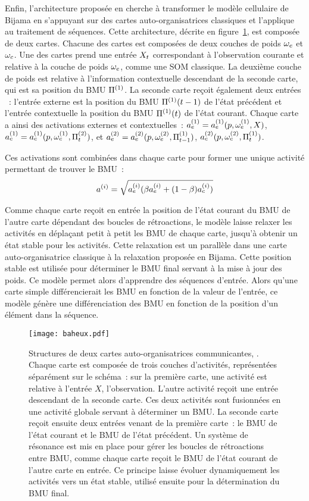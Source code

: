 \documentclass[../main]{subfiles}
\begin{document}
Enfin, l'architecture proposée en \cite{baheux_towards_2014} cherche à transformer le modèle cellulaire de Bijama en s'appuyant sur des cartes auto-organisatrices classiques et l'applique au traitement de séquences. Cette architecture, décrite en figure~\ref{fig:baheux}, est composée de deux cartes. 
Chacune des cartes est composées de deux couches de poids $\omega_e$ et $\omega_c$. Une des cartes prend une entrée $X_t$ correspondant à l'observation courante et relative à la couche de poids $\omega_e$, comme une SOM classique. 
La deuxième couche de poids est relative à l'information contextuelle descendant de la seconde carte, qui est sa position du BMU $\Pi^{({1})}$.
La seconde carte reçoit également deux entrées ~: l'entrée externe est la position du BMU $\Pi^{({1})}(t-1)$ de l'état précédent et l'entrée contextuelle la position du BMU $\Pi^{({1})}(t)$ de l'état courant. 
Chaque carte a ainsi des activations externes et contextuelles~: $a_e^{({1})} = a_e^{({1})}(p, \omega_e^{({1})},X)$, $a_c^{({1})} =  a_c^{({1})}(p, \omega_c^{({1})},\Pi^{({2})}_t)$, et $a_e^{({2})} = a_e^{({2})}(p, \omega_e^{({2})},\Pi^{({1})}_{t-1})$, $a_c^{({2})}(p, \omega_c^{({2})}, \Pi^{({1})}_t)$.

Ces activations sont combinées dans chaque carte pour former une unique activité permettant de trouver le BMU~:
$$
a^{({i})} = \sqrt{a_e^{({i})}(\beta a_e^{({i})} + (1-\beta) a_c^{({i})})}
$$

Comme chaque carte reçoit en entrée la position de l'état courant du BMU de l'autre carte dépendant des boucles de rétroactions, le modèle laisse relaxer les activités en déplaçant petit à petit les BMU de chaque carte, jusqu'à obtenir un état stable pour les activités. Cette relaxation est un parallèle dans une carte auto-organisatrice classique à la relaxation proposée en Bijama.
Cette position stable est utilisée pour déterminer le BMU final servant à la mise à jour des poids.
Ce modèle permet alors d'apprendre des séquences d'entrée. Alors qu'une carte simple différencierait les BMU en fonction de la valeur de l'entrée, ce modèle génère une différenciation des BMU en fonction de la position d'un élément dans la séquence.


\begin{figure}
    \centering
    \texttt{[image: baheux.pdf]}
    \caption{Structures de deux cartes auto-organisatrices communicantes, \parencite{baheux_towards_2014}. Chaque carte est composée de trois couches d'activités, représentées séparément sur le schéma~: sur la première carte, une activité est relative à l'entrée $X$, l'observation. L'autre activité reçoit une entrée descendant de la seconde carte. Ces deux activités sont fusionnées en une activité globale servant à déterminer un BMU. La seconde carte reçoit ensuite deux entrées venant de la première carte~: le BMU de l'état courant et le BMU de l'état précédent. Un système de résonance est mis en place pour gérer les boucles de rétroactions entre BMU, comme chaque carte reçoit le BMU de l'état courant de l'autre carte en entrée. Ce principe laisse évoluer dynamiquement les activités vers un état stable, utilisé ensuite pour la détermination du BMU final.\label{fig:baheux}}
\end{figure}
\end{document}
